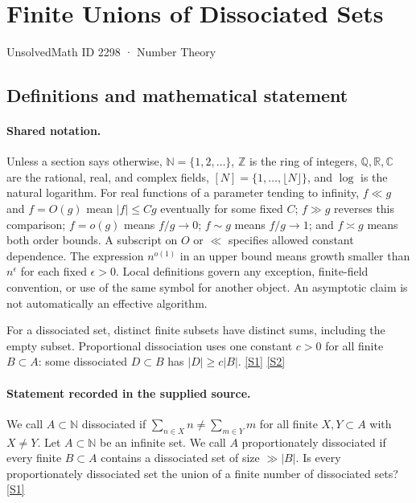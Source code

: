 \documentclass[11pt,a4paper]{article}
\newcommand{\N}{\mathbb{N}}
\newcommand{\Z}{\mathbb{Z}}
\newcommand{\Q}{\mathbb{Q}}
\newcommand{\R}{\mathbb{R}}
\newcommand{\C}{\mathbb{C}}
\newcommand{\sref}[2]{\hyperlink{source:#1:#2}{[S#2]}}
\begin{document}

\setcounter{section}{2297}

\section{Finite Unions of Dissociated Sets}\label{2298}

{\small\sffamily UnsolvedMath ID 2298 · Number Theory}

\subsection{Definitions and mathematical statement}

\paragraph{Shared notation.}Unless a section says otherwise, $\N=\{1,2,\ldots\}$,
$\Z$ is the ring of integers, $\Q,\R,\C$ are the rational, real, and complex
fields, $[N]=\{1,\ldots,\lfloor N\rfloor\}$, and $\log$ is the natural
logarithm. For real functions of a parameter tending to infinity,
$f\ll g$ and $f=O(g)$ mean $|f|\leq Cg$ eventually for some fixed $C$;
$f\gg g$ reverses this comparison; $f=o(g)$ means $f/g\to0$;
$f\sim g$ means $f/g\to1$; and $f\asymp g$ means both order bounds.
A subscript on $O$ or $\ll$ specifies allowed constant dependence.
The expression $n^{o(1)}$ in an upper bound means growth smaller than
$n^\epsilon$ for each fixed $\epsilon>0$. Local definitions govern any
exception, finite-field convention, or use of the same symbol for another
object. An asymptotic claim is not automatically an effective algorithm.



For a dissociated set, distinct finite subsets have distinct sums, including the empty subset. Proportional dissociation uses one constant $c>0$ for all finite $B\subset A$: some dissociated $D\subset B$ has $|D|\geq c|B|$. \sref{2298}{1} \sref{2298}{2}

\paragraph{Statement recorded in the supplied source.}
We call $A\subset \mathbb{N}$ dissociated if $\sum_{n\in X}n\neq \sum_{m\in Y}m$ for all finite $X,Y\subset A$ with $X\neq Y$.
Let $A\subset \mathbb{N}$ be an infinite set. We call $A$ proportionately dissociated if every finite $B\subset A$ contains a dissociated set of size $\gg \lvert B\rvert$.
Is every proportionately dissociated set the union of a finite number of dissociated sets? \sref{2298}{1}
\end{document}
